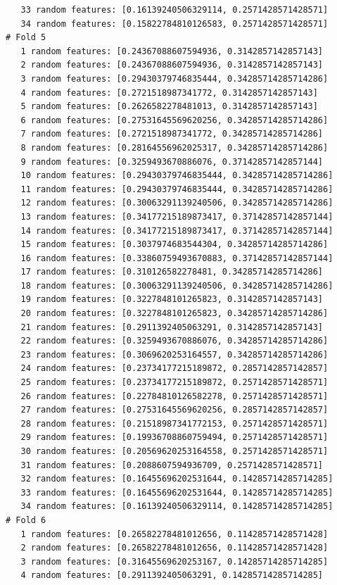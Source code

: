 \documentclass[12pt]{amsart}
\begin{document}
\begin{verbatim}
   33 random features: [0.16139240506329114, 0.2571428571428571]
   34 random features: [0.15822784810126583, 0.2571428571428571]
# Fold 5
   1 random features: [0.24367088607594936, 0.3142857142857143]
   2 random features: [0.24367088607594936, 0.3142857142857143]
   3 random features: [0.29430379746835444, 0.34285714285714286]
   4 random features: [0.2721518987341772, 0.3142857142857143]
   5 random features: [0.2626582278481013, 0.3142857142857143]
   6 random features: [0.27531645569620256, 0.34285714285714286]
   7 random features: [0.2721518987341772, 0.34285714285714286]
   8 random features: [0.28164556962025317, 0.34285714285714286]
   9 random features: [0.3259493670886076, 0.37142857142857144]
   10 random features: [0.29430379746835444, 0.34285714285714286]
   11 random features: [0.29430379746835444, 0.34285714285714286]
   12 random features: [0.30063291139240506, 0.34285714285714286]
   13 random features: [0.34177215189873417, 0.37142857142857144]
   14 random features: [0.34177215189873417, 0.37142857142857144]
   15 random features: [0.3037974683544304, 0.34285714285714286]
   16 random features: [0.33860759493670883, 0.37142857142857144]
   17 random features: [0.310126582278481, 0.34285714285714286]
   18 random features: [0.30063291139240506, 0.34285714285714286]
   19 random features: [0.3227848101265823, 0.3142857142857143]
   20 random features: [0.3227848101265823, 0.34285714285714286]
   21 random features: [0.2911392405063291, 0.3142857142857143]
   22 random features: [0.3259493670886076, 0.34285714285714286]
   23 random features: [0.3069620253164557, 0.34285714285714286]
   24 random features: [0.23734177215189872, 0.2857142857142857]
   25 random features: [0.23734177215189872, 0.2571428571428571]
   26 random features: [0.22784810126582278, 0.2571428571428571]
   27 random features: [0.27531645569620256, 0.2857142857142857]
   28 random features: [0.21518987341772153, 0.2571428571428571]
   29 random features: [0.19936708860759494, 0.2571428571428571]
   30 random features: [0.20569620253164558, 0.2571428571428571]
   31 random features: [0.2088607594936709, 0.2571428571428571]
   32 random features: [0.16455696202531644, 0.14285714285714285]
   33 random features: [0.16455696202531644, 0.14285714285714285]
   34 random features: [0.16139240506329114, 0.14285714285714285]
# Fold 6
   1 random features: [0.26582278481012656, 0.11428571428571428]
   2 random features: [0.26582278481012656, 0.11428571428571428]
   3 random features: [0.31645569620253167, 0.14285714285714285]
   4 random features: [0.2911392405063291, 0.14285714285714285]

\end{verbatim}
\end{document}
